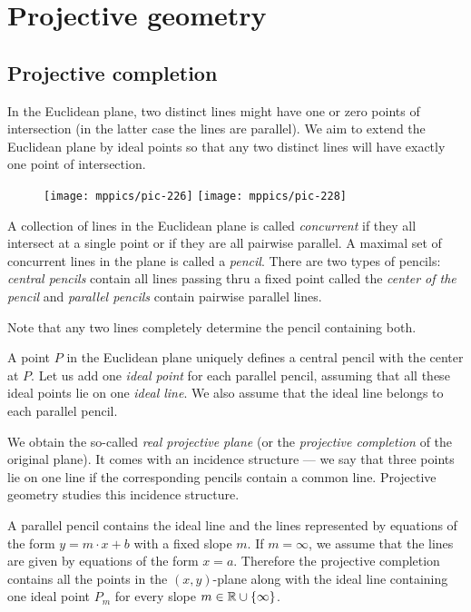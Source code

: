 \chapter{Projective geometry}\label{chap:proj}

\section{Projective completion}

In the Euclidean plane, two distinct lines might have one or zero points of intersection 
(in the latter case the lines are parallel).
We aim to extend the Euclidean plane by ideal points so that any two distinct lines will have exactly one point of intersection.

\begin{wrapfigure}{o}{31mm}
\centering
\texttt{[image: mppics/pic-226]}
\vskip4mm
\texttt{[image: mppics/pic-228]}
\end{wrapfigure}

A collection of lines in the Euclidean plane is called \emph{concurrent} if they all intersect at a single point 
or if they are all pairwise parallel.
A maximal set of concurrent lines in the plane is called a \emph{pencil}.
There are two types of pencils: 
\emph{central pencils} contain all lines passing thru a fixed point called the \emph{center of the pencil}
and  
\emph{parallel pencils} contain pairwise parallel lines.

Note that any two lines completely determine the pencil containing both.

A point $P$ in the Euclidean plane uniquely defines a central pencil with the center at $P$.
Let us add one \emph{ideal point} for each parallel pencil,
assuming that all these ideal points lie on one \emph{ideal line}.
We also assume that the ideal line belongs to each parallel pencil.

We obtain the so-called \emph{real projective plane} (or  the \emph{projective completion} of the original plane). 
It comes with an incidence structure --- we say that three points lie on one line if the corresponding pencils contain a common line.
Projective geometry studies this incidence structure.

A parallel pencil contains the ideal line and the lines represented by equations of the form $y=m\cdot x+b$ with a fixed slope $m$.
If $m=\infty$, we assume that the lines are given by equations of the form $x=a$.
Therefore the projective completion contains all the points in the $(x,y)$-plane along with the ideal line containing one ideal point $P_m$ for every slope $m\in\mathbb{R}\cup\{\infty\}$.

